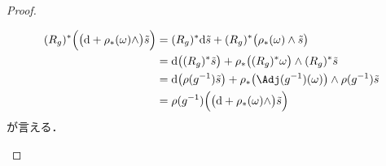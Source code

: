\documentclass[geometry_main]{subfiles}
\begin{document}
\begin{proof}
\begin{enumerate}
\begin{description}
            \begin{align}
                (R_g)^* \Bigl(\bigl( \dd + \rho_*(\omega) \wedge\bigr) \tilde{s}\Bigr)
                &= (R_g)^*\dd\tilde{s} + (R_g)^* \bigl( \rho_*(\omega) \wedge \tilde{s} \bigr) \\
                &= \dd \bigl( (R_g)^* \tilde{s} \bigr) + \rho_* \bigl( (R_g)^* \omega \bigr) \wedge (R_g)^* \tilde{s} \\
                &= \dd \bigl( \rho(g^{-1})\tilde{s} \bigr) + \rho_* \bigl(\Adj(g^{-1})(\omega)  \bigr) \wedge \rho(g^{-1}) \tilde{s} \\
                &= \rho(g^{-1}) \Bigl( \bigl(\dd + \rho_* (\omega) \wedge\bigr) \tilde{s} \Bigr) 
            \end{align}
            が言える．
        \end{description}
        

\end{enumerate}
\end{proof}
\end{document}
